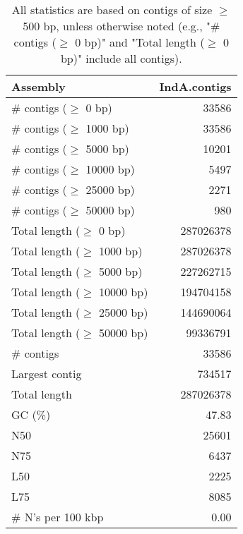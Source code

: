 \documentclass[12pt,a4paper]{article}
\begin{document}
\begin{table}[ht]
\begin{center}
\caption{All statistics are based on contigs of size $\geq$ 500 bp, unless otherwise noted (e.g., "\# contigs ($\geq$ 0 bp)" and "Total length ($\geq$ 0 bp)" include all contigs).}
\begin{tabular}{|l*{1}{|r}|}
\hline
Assembly & IndA.contigs \\ \hline
\# contigs ($\geq$ 0 bp) & 33586 \\ \hline
\# contigs ($\geq$ 1000 bp) & 33586 \\ \hline
\# contigs ($\geq$ 5000 bp) & 10201 \\ \hline
\# contigs ($\geq$ 10000 bp) & 5497 \\ \hline
\# contigs ($\geq$ 25000 bp) & 2271 \\ \hline
\# contigs ($\geq$ 50000 bp) & 980 \\ \hline
Total length ($\geq$ 0 bp) & 287026378 \\ \hline
Total length ($\geq$ 1000 bp) & 287026378 \\ \hline
Total length ($\geq$ 5000 bp) & 227262715 \\ \hline
Total length ($\geq$ 10000 bp) & 194704158 \\ \hline
Total length ($\geq$ 25000 bp) & 144690064 \\ \hline
Total length ($\geq$ 50000 bp) & 99336791 \\ \hline
\# contigs & 33586 \\ \hline
Largest contig & 734517 \\ \hline
Total length & 287026378 \\ \hline
GC (\%) & 47.83 \\ \hline
N50 & 25601 \\ \hline
N75 & 6437 \\ \hline
L50 & 2225 \\ \hline
L75 & 8085 \\ \hline
\# N's per 100 kbp & 0.00 \\ \hline
\end{tabular}
\end{center}
\end{table}
\end{document}
